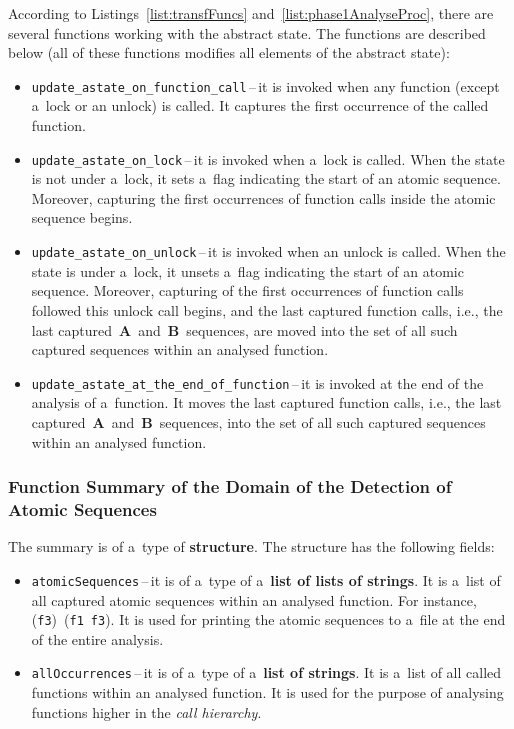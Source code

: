According to Listings~\ref{list:transfFuncs}
and~\ref{list:phase1AnalyseProc}, there are several functions working
with the abstract state. The functions are described below (all of these
functions modifies all elements of the abstract state):
\begin{itemize}
    \item
        \texttt{update\_astate\_on\_function\_call}\,--\,it is invoked
        when any function (except a~lock or an unlock) is called. It
        captures the first occurrence of the called function.

    \item
        \texttt{update\_astate\_on\_lock}\,--\,it is invoked when a~lock
        is called. When the state is not under a~lock, it sets a~flag
        indicating the start of an atomic sequence. Moreover, capturing
        the first occurrences of function calls inside the atomic
        sequence begins.

    \item
        \texttt{update\_astate\_on\_unlock}\,--\,it is invoked when an
        unlock is called. When the state is under a~lock, it unsets
        a~flag indicating the start of an atomic sequence. Moreover,
        capturing of the first occurrences of function calls followed this
        unlock call begins, and the last captured function calls, i.e.,
        the last captured~\textbf{A}~and~\textbf{B}~sequences, are
        moved into the set of all such captured sequences within an
        analysed function.

    \item
        \texttt{update\_astate\_at\_the\_end\_of\_function}\,--\,it is
        invoked at the end of the analysis of a~function. It moves
        the last captured function calls, i.e., the last
        captured~\textbf{A}~and~\textbf{B}~sequences, into the set
        of all such captured sequences within an analysed function.
\end{itemize}

\subsubsection{%
    Function Summary of the Domain of the Detection of Atomic Sequences
}

The summary is of a~type of \textbf{structure}. The structure has the
following fields:
\begin{itemize}
    \item
        \texttt{atomicSequences}\,--\,it is of a~type of a~\textbf{list of
        lists of strings}. It is a~list of all captured atomic sequences
        within an analysed function. For instance,
        (\texttt{f3})~(\texttt{f1}~\texttt{f3}). It is used for printing
        the atomic sequences to a~file at the end of the entire analysis.

    \item
        \texttt{allOccurrences}\,--\,it is of a~type of a~\textbf{list of
        strings}. It is a~list of all called functions within an analysed
        function. It is used for the purpose of analysing functions
        higher in the \emph{call hierarchy}.
\end{itemize}

